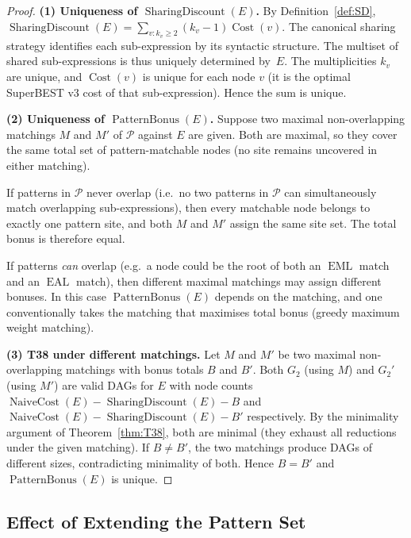\documentclass[12pt,a4paper]{article}
\theoremstyle{definition}
\newcommand{\EML}{\operatorname{EML}}
\newcommand{\EAL}{\operatorname{EAL}}
\newcommand{\Cost}{\operatorname{Cost}}
\newcommand{\NC}{\operatorname{NaiveCost}}
\newcommand{\SD}{\operatorname{SharingDiscount}}
\newcommand{\PB}{\operatorname{PatternBonus}}
\begin{document}
\begin{proof}
\textbf{(1) Uniqueness of $\SD(E)$.}
By Definition~\ref{def:SD}, $\SD(E) = \sum_{v: k_v \geq 2} (k_v - 1)\Cost(v)$.
The canonical sharing strategy identifies each sub-expression by its
syntactic structure.  The multiset of shared sub-expressions is thus uniquely
determined by~$E$.  The multiplicities $k_v$ are unique, and $\Cost(v)$ is
unique for each node $v$ (it is the optimal SuperBEST v3 cost of that
sub-expression).  Hence the sum is unique.

\textbf{(2) Uniqueness of $\PB(E)$.}
Suppose two maximal non-overlapping matchings $M$ and $M'$ of $\mathcal{P}$
against $E$ are given.  Both are maximal, so they cover the same total set of
pattern-matchable nodes (no site remains uncovered in either matching).

If patterns in $\mathcal{P}$ never overlap (i.e.\ no two patterns in
$\mathcal{P}$ can simultaneously match overlapping sub-expressions), then every
matchable node belongs to exactly one pattern site, and both $M$ and $M'$
assign the same site set.  The total bonus is therefore equal.

If patterns \emph{can} overlap (e.g.\ a node could be the root of both an
$\EML$ match and an $\EAL$ match), then different maximal matchings may assign
different bonuses.  In this case $\PB(E)$ depends on the matching, and one
conventionally takes the matching that maximises total bonus (greedy maximum
weight matching).

\textbf{(3) T38 under different matchings.}
Let $M$ and $M'$ be two maximal non-overlapping matchings with bonus totals
$B$ and $B'$.  Both $G_2$ (using $M$) and $G_2'$ (using $M'$) are valid DAGs
for $E$ with node counts $\NC(E) - \SD(E) - B$ and $\NC(E) - \SD(E) - B'$
respectively.  By the minimality argument of Theorem~\ref{thm:T38}, both are
minimal (they exhaust all reductions under the given matching).  If $B \neq
B'$, the two matchings produce DAGs of different sizes, contradicting
minimality of both.  Hence $B = B'$ and $\PB(E)$ is unique.
\end{proof}

\subsection{Effect of Extending the Pattern Set}
\end{document}
